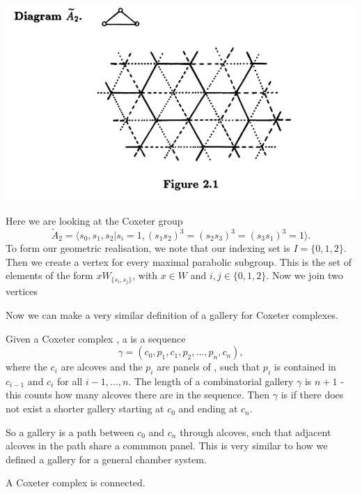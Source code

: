 \documentclass[11pt]{article}
\begin{document}
\includegraphics[scale=0.6]{Screenshot 2023-02-20 at 14.12.15.1.png}\\

\begin{example}
   Here we are looking at the Coxeter group 
    \[\tilde{A}_2=\langle s_0,s_1,s_2|s_i=1, (s_1s_2)^3=(s_2s_3)^3=(s_3s_1)^3=1\rangle.\]
    To form our geometric realisation, we note that our indexing set is $I=\{0,1,2\}$. Then we create a vertex for every maximal parabolic subgroup. This is the set of elements of the form $xW_{\{s_i,s_j\}}$, with $x\in W$ and $i,j\in \{0,1,2\}$. Now we join two vertices 
\end{example}

Now we can make a very similar definition of a gallery for Coxeter complexes.

\begin{definition}
    Given a Coxeter complex \sg, a  is a sequence
    \[\gamma = (c_0,p_1,c_1,p_2,...,p_n,c_n),\]
    where the $c_i$ are alcoves and the $p_i$ are panels of \sg, such that $p_i$ is contained in $c_{i-1}$ and $c_{i}$ for all $i-1,...,n$. The length of a combinatorial gallery $\gamma$ is $n+1$ - this counts how many alcoves there are in the sequence. Then $\gamma$ is  if there does not exist a shorter gallery starting at $c_0$ and ending at $c_n$. 
\end{definition}

So a gallery is a path between $c_0$ and $c_n$ through alcoves, such that adjacent alcoves in the path share a commmon panel. This is very similar to how we defined a gallery for a general chamber system. 

\begin{lemma}
    A Coxeter complex is connected.
\end{lemma}
\end{document}
